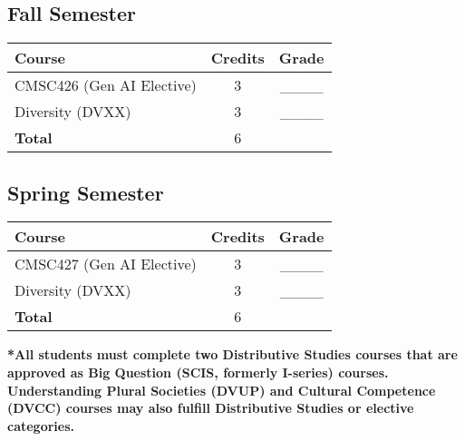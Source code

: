 \documentclass{article}
\begin{document}
\subsection*{Fall Semester}
\begin{tabular}{|l|c|c|}
    \hline
    Course & Credits & Grade \\
    \hline
    CMSC426 (Gen AI Elective) & 3 & ____ \\
    Diversity (DVXX) & 3 & ____ \\
    \hline
    \textbf{Total} & 6 & \\
    \hline
\end{tabular}

\subsection*{Spring Semester}
\begin{tabular}{|l|c|c|}
    \hline
    Course & Credits & Grade \\
    \hline
    CMSC427 (Gen AI Elective) & 3 & ____ \\
    Diversity (DVXX) & 3 & ____ \\
    \hline
    \textbf{Total} & 6 & \\
    \hline
\end{tabular}

\vspace{1cm}
\textbf{*All students must complete two Distributive Studies courses that are approved as Big Question (SCIS, formerly I-series) courses. Understanding Plural Societies (DVUP) and Cultural Competence (DVCC) courses may also fulfill Distributive Studies or elective categories.}
\end{document}
